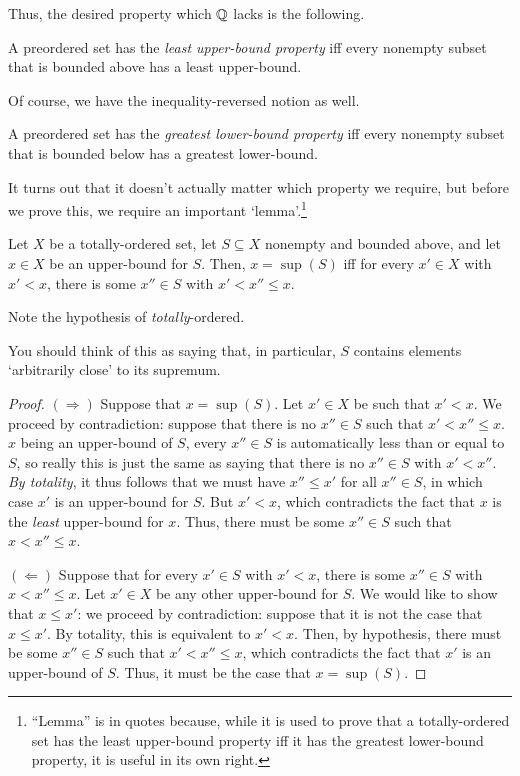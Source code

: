 Thus, the desired property which $\mathbb{Q}$ lacks is the following.
\begin{dfn}
A preordered set has the \emph{least upper-bound property} iff every nonempty subset that is bounded above has a least upper-bound.
\end{dfn}
Of course, we have the inequality-reversed notion as well.
\begin{dfn}
A preordered set has the \emph{greatest lower-bound property} iff every nonempty subset that is bounded below has a greatest lower-bound.
\end{dfn}
It turns out that it doesn't actually matter which property we require, but before we prove this, we require an important `lemma'.\footnote{``Lemma'' is in quotes because, while it is used to prove that a totally-ordered set has the least upper-bound property iff it has the greatest lower-bound property, it is useful in its own right.}
\begin{prp}\label{prp1.4.11}
Let $X$ be a totally-ordered set, let $S\subseteq X$ nonempty and bounded above, and let $x\in X$ be an upper-bound for $S$.  Then, $x=\sup (S)$ iff for every $x'\in X$ with $x'<x$, there is some $x''\in S$ with $x'<x''\leq x$.
\begin{rmk}
Note the hypothesis of \emph{totally}-ordered.
\end{rmk}
\begin{rmk}
You should think of this as saying that, in particular, $S$ contains elements `arbitrarily close' to its supremum.
\end{rmk}
\begin{proof}
$(\Rightarrow )$ Suppose that $x=\sup (S)$.  Let $x'\in X$ be such that $x'<x$.  We proceed by contradiction:  suppose that there is no $x''\in S$ such that $x'<x''\leq x$.  $x$ being an upper-bound of $S$, every $x''\in S$ is automatically less than or equal to $S$, so really this is just the same as saying that there is no $x''\in S$ with $x'<x''$.  \emph{By totality}, it thus follows that we must have $x''\leq x'$ for all $x''\in S$, in which case $x'$ is an upper-bound for $S$.  But $x'<x$, which contradicts the fact that $x$ is the \emph{least} upper-bound for $x$.  Thus, there must be some $x''\in S$ such that $x<x''\leq x$.

\blankline
\noindent
$(\Leftarrow )$ Suppose that for every $x'\in S$ with $x'<x$, there is some $x''\in S$ with $x<x''\leq x$.  Let $x'\in X$ be any other upper-bound for $S$.  We would like to show that $x\leq x'$:  we proceed by contradiction:  suppose that it is not the case that $x\leq x'$.  By totality, this is equivalent to $x'<x$.  Then, by hypothesis, there must be some $x''\in S$ such that $x'<x''\leq x$, which contradicts the fact that $x'$ is an upper-bound of $S$.  Thus, it must be the case that $x=\sup (S)$.
\end{proof}
\end{prp}
